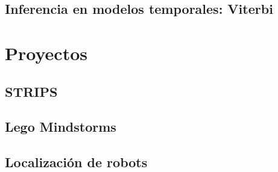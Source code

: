 \documentclass[12pt,openany]{book}
\begin{document}




\chapter{Inferencia en modelos temporales: Viterbi}








\part{Proyectos}



\chapter{STRIPS}




\chapter{Lego Mindstorms}





\chapter{Localización de robots}







%
\end{document}
